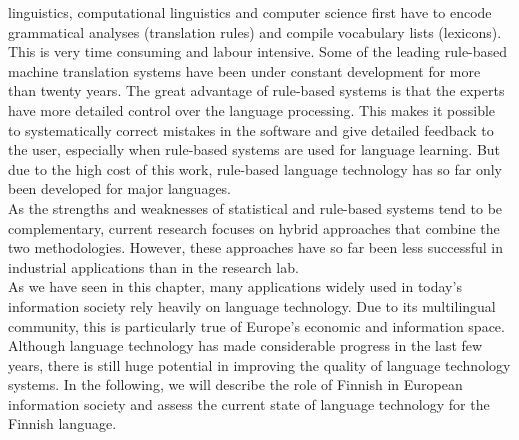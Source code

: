 \begin{multicols}{2}
linguistics, computational linguistics and computer science first have to
encode grammatical analyses (translation rules) and compile vocabulary lists
(lexicons). This is very time consuming and labour intensive. Some of the
leading rule-based machine translation systems have been under constant
development for more than twenty years. The great advantage of rule-based
systems is that the experts have more detailed control over the language
processing. This makes it possible to systematically correct mistakes in the
software and give detailed feedback to the user, especially when rule-based
systems are used for language learning. But due to the high cost of this work,
rule-based language technology has so far only been developed for major
languages.\\
As the strengths and weaknesses of statistical and rule-based systems tend to
be complementary, current research focuses on hybrid approaches that combine
the two methodologies. However, these approaches have so far been less
successful in industrial applications than in the research lab.\\
As we have seen in this chapter, many applications widely used in today’s
information society rely heavily on language technology. Due to its
multilingual community, this is particularly true of Europe’s economic and
information space. Although language technology has made considerable progress
in the last few years, there is still huge potential in improving the quality
of language technology systems. In the following, we will describe the role of
Finnish in European information society and assess the current state of
language technology for the Finnish language.

\end{multicols}
\clearpage
{}
